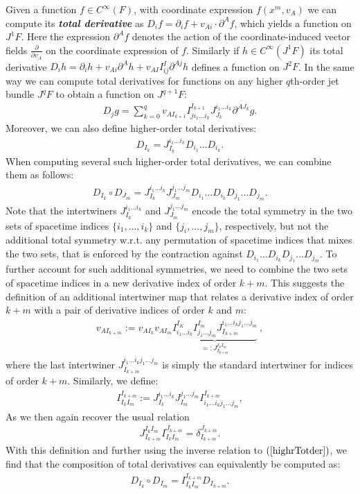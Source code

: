 Given a function $f \in C^{\infty}(F)$, with coordinate expression $f(x^m, v_A)$ we can compute its \textit{\textbf{total derivative}} as $D_if = \partial_i f + v_{Ai}\cdot \partial^A f$, which yields a function on $J^1F$. Here the expression $\partial^A f$ denotes the action of the coordinate-induced vector fields $\frac{\partial}{\partial v_A}$ on the coordinate expression of $f$. Similarly if $h \in C^{\infty}(J^1F)$ its total derivative $D_i h = \partial_i h + v_{Ai} \partial^A h + v_{AI}I^I_{ij} \partial ^{Aj} h$ defines a function on $J^2F$. In the same way we can compute total derivatives for functions on any higher $q$th-order jet bundle $J^qF$ to obtain a function on $J^{q+1}F$:
\begin{align}\label{totDer}
    D_j g = \sum _{k = 0}^{q}  v_{AI_{k+1}}I^{I_{k+1}}_{ji_1...i_k}J_{J_k}^{i_1...i_k}\partial^{AJ_k} g.
\end{align}
Moreover, we can also define higher-order total derivatives:
\begin{align}\label{highrTotder}
    D_{I_k} = J_{I_k}^{i_1...i_k}D_{i_1} ...  D_{i_k}.
\end{align}
When computing several such higher-order total derivatives, we can combine them as follows:
\begin{align}
D_{I_k} \circ D_{J_m} = J_{I_k}^{i_1...i_k}J_{J_m}^{j_1...j_m}D_{i_1}  ...  D_{i_k}  D_{j_1}  ...  D_{j_m}.
\end{align}
Note that the intertwiners $J_{I_k}^{i_1...i_k}$ and $J_{J_m}^{j_1...j_m}$ encode the total symmetry in the two sets of spacetime indices $\{i_1,...,i_k\}$ and $\{j_i,...,j_m\}$, respectively, but not the additional total symmetry w.r.t. any permutation of spacetime indices that mixes the two sets, that is enforced by the contraction against $D_{i_1}  ...  D_{i_k}  D_{j_1}  ...  D_{j_m}$.
To further account for such additional symmetries, we need to combine the two sets of spacetime indices in a new derivative index of order $k+m$. This suggests the definition of an additional intertwiner map that relates a derivative index of order $k+m$ with a pair of derivative indices of order $k$ and $m$:
\begin{align}
   v_{AI_{k+m}} := v_{AI_k} v_{AI_m}
   \underbrace{I^{I_K}_{i_1...i_k}I^{I_m}_{j_1...j_m}J^{i_1...i_k j_1...j_m}_{I_{k+m}}}_{=: J^{I_k I_m}_{I_{k+m}}}  \   ,
\end{align}
where the last intertwiner $J^{i_1...i_k j_1...j_m}_{I_{k+m}}$ is simply the standard intertwiner for indices of order $k+m$.
Similarly, we define:
\begin{align}
    I^{I_{k+m}}_{I_k I_m} := J_{I_k}^{i_1...i_k}J_{I_m}^{j_1...j_m}I^{I_{k+m} }_{i_1...i_k j_1...j_m},
\end{align}
As we then again recover the usual relation \begin{align}
J^{I_kI_m}_{I_{k+m}} I^{J_{k+m}}_{I_k I_m} = \delta^{J_{k+m}}_{I_{k+m}}.
\end{align}
With this definition and further using the inverse relation to $(\ref{highrTotder})$, we find that the composition of total derivatives can equivalently be computed as:
\begin{align}
   D_{I_k} \circ D_{I_m} =  I^{I_{k+m} }_{I_k I_m} D_{I_{k+m}}.
\end{align}
 

